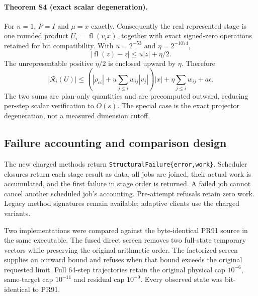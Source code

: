 \paragraph{Theorem S4 (exact scalar degeneration).}
For $n=1$, $P=I$ and $\mu=x$ exactly. Consequently the real represented stage is one rounded product $U_i=\operatorname{fl}(v_i x)$, together with exact signed-zero operations retained for bit compatibility. With $u=2^{-53}$ and $\eta=2^{-1074}$,
\begin{equation}
 |\operatorname{fl}(z)-z|\le u|z|+\eta/2.
\end{equation}
The unrepresentable positive $\eta/2$ is enclosed upward by $\eta$. Therefore
\begin{equation}
 |\mathcal R_i(U)|\le
 \left(|\rho_{ci}|+u\sum_{j\le i}w_{ij}|v_j|\right)|x|
 +\eta\sum_{j\le i}w_{ij}+a\epsilon.
\end{equation}
The two sums are plan-only quantities and are precomputed outward, reducing per-step scalar verification to $O(s)$. The special case is the exact projector degeneration, not a measured dimension cutoff.

\subsection{Failure accounting and comparison design}
The new charged methods return \texttt{StructuralFailure\{error,work\}}. Scheduler closures return each stage result as data, all jobs are joined, their actual work is accumulated, and the first failure in stage order is returned. A failed job cannot cancel another scheduled job's accounting. Pre-attempt refusals retain zero work. Legacy method signatures remain available; adaptive clients use the charged variants.

Two implementations were compared against the byte-identical PR91 source in the same executable. The fused direct screen removes two full-state temporary vectors while preserving the original arithmetic order. The factorized screen supplies an outward bound and refuses when that bound exceeds the original requested limit. Full 64-step trajectories retain the original physical cap $10^{-6}$, same-target cap $10^{-11}$ and residual cap $10^{-9}$. Every observed state was bit-identical to PR91.

